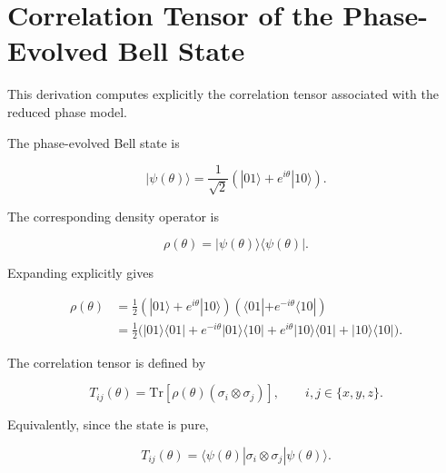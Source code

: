 
\section{Correlation Tensor of the Phase-Evolved Bell State}

This derivation computes explicitly the correlation tensor associated with the reduced phase model.

\medskip

The phase-evolved Bell state is

\begin{equation}
|\psi(\theta)\rangle
=
\frac{1}{\sqrt{2}}
\left(
|01\rangle
+
e^{i\theta}|10\rangle
\right).
\label{eq:der_phase_bell_state}
\end{equation}

The corresponding density operator is

\begin{equation}
\rho(\theta)
=
|\psi(\theta)\rangle\langle\psi(\theta)|.
\label{eq:der_phase_density_operator}
\end{equation}

Expanding explicitly gives

\begin{align}
\rho(\theta)
&=
\frac{1}{2}
\left(
|01\rangle
+
e^{i\theta}|10\rangle
\right)
\left(
\langle 01|
+
e^{-i\theta}\langle 10|
\right)
\nonumber
\\
&=
\frac{1}{2}
\Big(
|01\rangle\langle 01|
+
e^{-i\theta}|01\rangle\langle 10|
+
e^{i\theta}|10\rangle\langle 01|
+
|10\rangle\langle 10|
\Big).
\label{eq:der_phase_density_expansion}
\end{align}

\medskip

The correlation tensor is defined by

\begin{equation}
T_{ij}(\theta)
=
\mathrm{Tr}
\left[
\rho(\theta)
\left(
\sigma_i \otimes \sigma_j
\right)
\right],
\qquad
i,j \in \{x,y,z\}.
\label{eq:der_correlation_tensor_definition}
\end{equation}

Equivalently, since the state is pure,

\begin{equation}
T_{ij}(\theta)
=
\langle \psi(\theta) |
\sigma_i \otimes \sigma_j
|
\psi(\theta)
\rangle.
\label{eq:der_correlation_tensor_pure_state}
\end{equation}

